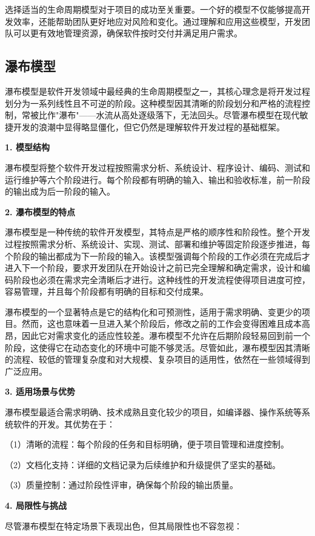 选择适当的生命周期模型对于项目的成功至关重要。一个好的模型不仅能够提高开发效率，还能帮助团队更好地应对风险和变化。通过理解和应用这些模型，开发团队可以更有效地管理资源，确保软件按时交付并满足用户需求。

\subsection{瀑布模型}

瀑布模型是软件开发领域中最经典的生命周期模型之一，其核心理念是将开发过程划分为一系列线性且不可逆的阶段。这种模型因其清晰的阶段划分和严格的流程控制，常被比作"瀑布"——水流从高处逐级落下，无法回头。尽管瀑布模型在现代敏捷开发的浪潮中显得略显僵化，但它仍然是理解软件开发过程的基础框架。

\textbf{1. 模型结构}

瀑布模型将整个软件开发过程按照需求分析、系统设计、程序设计、编码、测试和运行维护等六个阶段进行。每个阶段都有明确的输入、输出和验收标准，前一阶段的输出成为后一阶段的输入。

\textbf{2. 瀑布模型的特点}

瀑布模型是一种传统的软件开发模型，其特点是严格的顺序性和阶段性。整个开发过程按照需求分析、系统设计、实现、测试、部署和维护等固定阶段逐步推进，每个阶段的输出都成为下一阶段的输入。该模型强调每个阶段的工作必须在完成后才进入下一个阶段，要求开发团队在开始设计之前已完全理解和确定需求，设计和编码阶段也必须在需求完全清晰后才进行。这种线性的开发流程使得项目进度可控，容易管理，并且每个阶段都有明确的目标和交付成果。

瀑布模型的一个显著特点是它的结构化和可预测性，适用于需求明确、变更少的项目。然而，这也意味着一旦进入某个阶段后，修改之前的工作会变得困难且成本高昂，因此它对需求变化的适应性较差。瀑布模型不允许在后期阶段轻易回到前一个阶段，这使得它在动态变化的环境中可能不够灵活。尽管如此，瀑布模型因其清晰的流程、较低的管理复杂度和对大规模、复杂项目的适用性，依然在一些领域得到广泛应用。

\textbf{3. 适用场景与优势}

瀑布模型最适合需求明确、技术成熟且变化较少的项目，如编译器、操作系统等系统软件的开发。其优势在于：

（1）清晰的流程：每个阶段的任务和目标明确，便于项目管理和进度控制。

（2）文档化支持：详细的文档记录为后续维护和升级提供了坚实的基础。

（3）质量控制：通过阶段性评审，确保每个阶段的输出质量。

\textbf{4. 局限性与挑战}

尽管瀑布模型在特定场景下表现出色，但其局限性也不容忽视：

